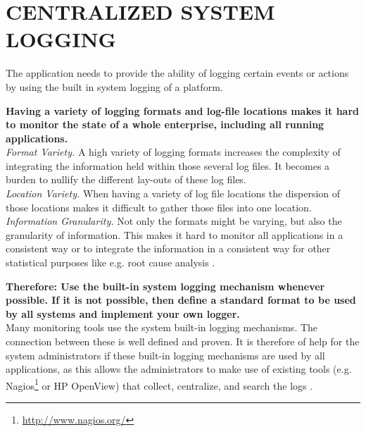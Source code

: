 \newpage
\section*{CENTRALIZED SYSTEM LOGGING}

The application needs to provide the ability of logging certain events or actions by using the built in system logging of a platform. 

\begin{center}
  
\end{center}

\textbf{Having a variety of logging formats and log-file locations makes it hard to monitor the state of a whole enterprise, including all running applications.}\\

\textit{Format Variety.} A high variety of logging formats increases the complexity of integrating the information held within those several log files. It becomes a burden to nullify the different lay-outs of these log files.\\ 

\textit{Location Variety.} When having a variety of log file locations the dispersion of those locations makes it difficult to gather those files into one location.\\

\textit{Information Granularity.} Not only the formats might be varying, but also the granularity of information. This makes it hard to monitor all applications in a consistent way or to integrate the information in a consistent way for other statistical purposes like e.g. root cause analysis \cite{conf/mkwi/PaschkeS06}.

\begin{center}
   
\end{center}

\textbf{Therefore: Use the built-in system logging mechanism whenever possible. If it is not possible, then define a standard format to be used by all systems and implement your own logger.}\\

Many monitoring tools use the system built-in logging mechanisms. The connection between these is well defined and proven. It is therefore of help for the system administrators if these built-in logging mechanisms are used by all applications, as this allows the administrators to make use of existing tools (e.g. Nagios\footnote{\url{http://www.nagios.org/}} or HP OpenView) that collect, centralize, and search the logs \cite{Limoncelli2011a}.

